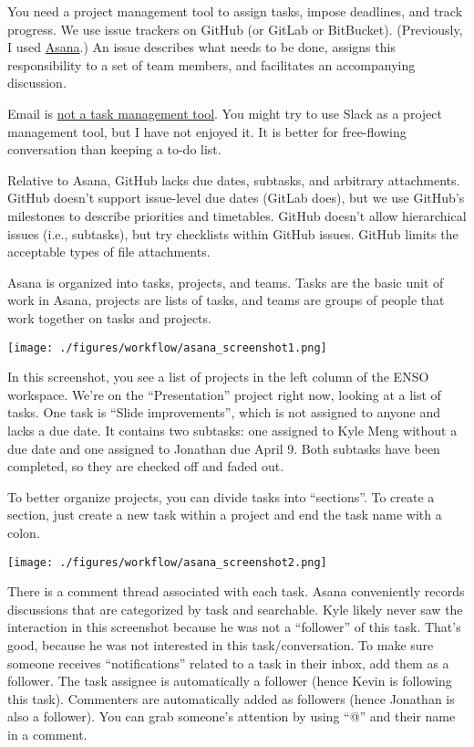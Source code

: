 You need a project management tool to assign tasks, impose deadlines, and track progress.
We use issue trackers on GitHub (or GitLab or BitBucket).
(Previously, I used \href{https://asana.com}{Asana}.)
An issue describes what needs to be done, assigns this responsibility to a set of team members,
and facilitates an accompanying discussion.

Email is \href{https://facilethings.com/blog/en/your-email-is-not-a-todo-list}{not a task management tool}.
You might try to use Slack as a project management tool, but I have not enjoyed it.
It is better for free-flowing conversation than keeping a to-do list.

Relative to Asana, GitHub lacks due dates, subtasks, and arbitrary attachments.
GitHub doesn't support issue-level due dates (GitLab does),
but we use GitHub's milestones to describe priorities and timetables.
GitHub doesn't allow hierarchical issues (i.e., subtasks),
but try checklists within GitHub issues.
GitHub limits the acceptable types of file attachments.


Asana is organized into tasks, projects, and teams.
Tasks are the basic unit of work in Asana,
projects are lists of tasks, and
teams are groups of people that work together on tasks and projects.

\begin{center}
\texttt{[image: ./figures/workflow/asana\_screenshot1.png]}
\end{center}

In this screenshot,
you see a list of projects in the left column of the ENSO workspace.
We're on the ``Presentation'' project right now, looking at a list of tasks.
One task is ``Slide improvements'', which is not assigned to anyone and lacks a due date.
It contains two subtasks:
one assigned to Kyle Meng without a due date
and
one assigned to Jonathan due April 9.
Both subtasks have been completed, so they are checked off and faded out.

To better organize projects, you can divide tasks into ``sections''.
To create a section, just create a new task within a project and end the task name with a colon.


\begin{center}
\texttt{[image: ./figures/workflow/asana\_screenshot2.png]}
\end{center}

There is a comment thread associated with each task.
Asana conveniently records discussions that are categorized by task and searchable.
Kyle likely never saw the interaction in this screenshot because he was not a ``follower'' of this task.
That's good, because he was not interested in this task/conversation.
To make sure someone receives ``notifications'' related to a task in their inbox, add them as a follower.
The task assignee is automatically a follower (hence Kevin is following this task).
Commenters are automatically added as followers (hence Jonathan is also a follower).
You can grab someone's attention by using ``@'' and their name in a comment.


